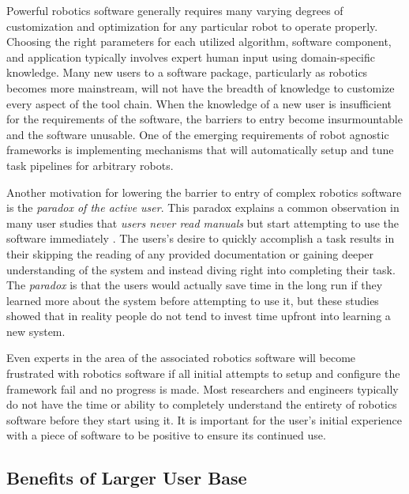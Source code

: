 \documentclass[10pt,journal,compsoc]{joser1}
\begin{document}
{Powerful robotics software generally requires many varying degrees of
customization and optimization for any particular robot to operate properly.
Choosing the right parameters for each utilized algorithm, software component,
and application typically involves expert human input using domain-specific
knowledge. Many new users to a software package, particularly as robotics
becomes more mainstream, will not have the breadth of knowledge to customize
every aspect of the tool chain. When the knowledge of a new user is insufficient
for the requirements of the software, the barriers to entry become
insurmountable and the software unusable. One of the emerging requirements of
robot agnostic frameworks is implementing mechanisms that will automatically
setup and tune task pipelines for arbitrary robots.

Another motivation for lowering the barrier to entry of complex robotics
software is the \textit{paradox of the active user}. This paradox explains a
common observation in many user studies that \textit{users never read manuals}
but start attempting to use the software immediately
\cite{carroll1987interfacing}. The users's desire to quickly accomplish a task
results in their skipping the reading of any provided documentation or gaining
deeper understanding of the system and instead diving right into completing
their task. The \textit{paradox} is that the users would actually save time in
the long run if they learned more about the system before attempting to use it,
but these studies showed that in reality people do not tend to invest time
upfront into learning a new system.

Even experts in the area of the associated robotics software will become
frustrated with robotics software if all initial attempts to setup and configure
the framework fail and no progress is made. Most researchers and engineers
typically do not have the time or ability to completely understand the entirety
of robotics software before they start using it. It is important for the
user's initial experience with a piece of software to be positive to ensure its
continued use.

\subsection{Benefits of Larger User Base}

}
\end{document}
